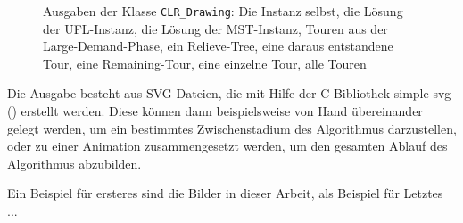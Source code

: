 \documentclass[a4paper,ngerman,11pt,bibtotoc]{scrartcl}
\theoremstyle{definition}
\theoremstyle{plain}
\theoremstyle{remark}
\def\Cpp{{C\nolinebreak[4]\hspace{-.05em}\raisebox{.4ex}{\tiny\bf ++}}}
\begin{document}
\begin{figure}[H]
	
	\caption{Ausgaben der Klasse \lstinline|CLR_Drawing|: Die Instanz selbst, die Lösung der UFL-Instanz, die Lösung der MST-Instanz, Touren aus der Large-Demand-Phase, ein Relieve-Tree, eine daraus entstandene Tour, eine Remaining-Tour, eine einzelne Tour, alle Touren}
\end{figure}

Die Ausgabe besteht aus SVG-Dateien, die mit Hilfe der \Cpp-Bibliothek simple-svg (\cite{simple-svg}) erstellt werden. Diese können dann beispielsweise von Hand übereinander gelegt werden, um ein bestimmtes Zwischenstadium des Algorithmus darzustellen, oder zu einer Animation zusammengesetzt werden, um den gesamten Ablauf des Algorithmus abzubilden.

Ein Beispiel für ersteres sind die Bilder in dieser Arbeit, als Beispiel für Letztes ...


\end{document}
